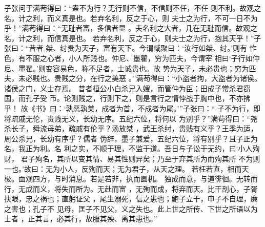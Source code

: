 \documentclass[]{article}
\begin{document}
子张问于满苟得曰：``盍不为行？无行则不信，不信则不任，不任
则不利。故观之名，计之利，而义真是也。若弃名利，反之于心，则
夫士之为行，不可一日不为乎！''满苟得曰：``无耻者富，多信者显
。夫名利之大者，几在无耻而信。故观之名，计之利，而信真是也。
若弃名利，反之于心，则夫士之为行，抱其天乎！''子张曰：``昔者
桀、纣贵为天子，富有天下。今谓臧聚曰：`汝行如桀、纣。'则有
怍色，有不服之心者，小人所贱也。仲尼、墨翟，穷为匹夫，今谓宰
相曰`子行如仲尼、墨翟。'则变容易色，称不足者，士诚贵也。故
势为天子，未必贵也；穷为匹夫，未必贱也。贵贱之分，在行之美恶
。''满苟得曰：``小盗者拘，大盗者为诸侯。诸侯之门，义士存焉。
昔者桓公小白杀兄入嫂，而管仲为臣；田成子常杀君窃国，而孔子受
币。论则贱之，行则下之，则是言行之情悖战于胸中也，不亦拂乎！
故《书》曰：`孰恶孰美，成者为首，不成者为尾。'''子张曰：``
子不为行，即将疏戚无伦，贵贱无义，长幼无序。五纪六位，将何以
为别乎？''满苟得曰：``尧杀长子，舜流母弟，疏戚有伦乎？汤放桀
，武王杀纣，贵贱有义乎？王季为适，周公杀兄，长幼有序乎？儒者
伪辞，墨子兼爱，五纪六位，将有别乎？且子正为名，我正为利。名
利之实，不顺于理，不监于道。吾日与子讼于无约，曰`小人殉财，
君子殉名，其所以变其情、易其性则异矣；乃至于弃其所为而殉其所
不为则一也。'故曰：无为小人，反殉而天；无为君子，从天之理。
若枉若直，相而天极。面观四方，与时消息。若是若非，执而圆机。
独成而意，与道徘徊。无转而行，无成而义，将失而所为。无赴而富
，无殉而成，将弃而天。比干剖心，子胥抉眼，忠之祸也；直躬证父
，尾生溺死，信之患也；鲍子立干，申子不自理，廉之害也；孔子不
见母，匡子不见父，义之失也。此上世之所传、下世之所语以为士者
，正其言，必其行，故服其殃、离其患也。''
\end{document}
